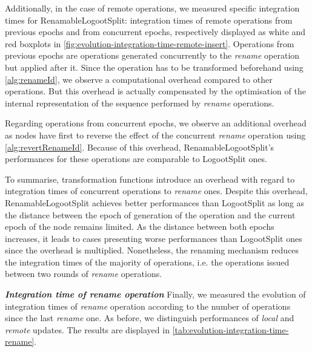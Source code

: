 \documentclass[10pt,journal,compsoc]{IEEEtran}
\newcommand{\ie}{i.e. }
\newcommand{\headerparagraph}[1]{\textbf{\emph{#1}}\quad}
\begin{document}
Additionally, in the case of remote operations, we measured specific integration times for RenamableLogootSplit: integration times of remote operations from previous epochs and from concurrent epochs, respectively displayed as white and red boxplots in \autoref{fig:evolution-integration-time-remote-insert}.
Operations from previous epochs are operations generated concurrently to the \emph{rename} operation but applied after it.
Since the operation has to be transformed beforehand using \autoref{alg:renameId}, we observe a computational overhead compared to other operations.
But this overhead is actually compensated by the optimisation of the internal representation of the sequence performed by \emph{rename} operations.

Regarding operations from concurrent epochs, we observe an additional overhead as nodes have first to reverse the effect of the concurrent \emph{rename} operation using \autoref{alg:revertRenameId}.
Because of this overhead, RenamableLogootSplit's performances for these operations are comparable to LogootSplit ones.

To summarise, transformation functions introduce an overhead with regard to integration times of concurrent operations to \emph{rename} ones.
Despite this overhead, RenamableLogootSplit achieves better performances than LogootSplit as long as the distance between the epoch of generation of the operation and the current epoch of the node remains limited.
As the distance between both epochs increases, it leads to cases presenting worse performances than LogootSplit ones since the overhead is multiplied.
Nonetheless, the renaming mechanism reduces the integration times of the majority of operations, \ie the operations issued between two rounds of \emph{rename} operations.

\headerparagraph{Integration time of \emph{rename} operation}
%
Finally, we measured the evolution of integration times of \emph{rename} operation according to the number of operations since the last \emph{rename} one.
As before, we distinguish performances of \emph{local} and \emph{remote} updates.
The results are displayed in \autoref{tab:evolution-integration-time-rename}.
\end{document}
